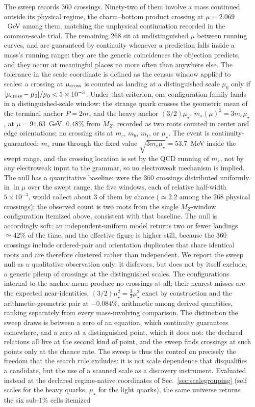 \documentclass[aps,twocolumn,superscriptaddress,nofootinbib,floatfix]{revtex4-2}
\newcommand{\mstar}{\mu_\star}
\begin{document}
The sweep records 360 crossings. Ninety-two of them involve a mass continued outside its physical regime, the charm--bottom product crossing at $\mu=2.069$~GeV among them, matching the unphysical continuation recorded in the common-scale trial. The remaining 268 sit at undistinguished $\mu$ between running curves, and are guaranteed by continuity whenever a prediction falls inside a mass's running range: they are the generic coincidences the objection predicts, and they occur at meaningful places no more often than anywhere else. The tolerance in the scale coordinate is defined as the census window applied to scales: a crossing at $\mu_{\rm cross}$ is counted as landing at a distinguished scale $\mu_0$ only if $|\mu_{\rm cross}-\mu_0|/\mu_0<5\times10^{-3}$. Under that criterion, one configuration family lands in a distinguished-scale window: the strange quark crosses the geometric mean of the terminal anchor $P=2m_e$ and the heavy anchor $(3/2)\mstar$, $m_s(\mu)^2=3m_e\mstar$, at $\mu=91.63$~GeV, $0.48\%$ from $M_Z$, recorded as two roots counted in center and edge orientations; no crossing sits at $m_c$, $m_b$, $m_t$, or $\mstar$. The event is continuity-guaranteed: $m_s$ runs through the fixed value $\sqrt{3m_e\mstar}=53.7$~MeV inside the swept range, and the crossing location is set by the QCD running of $m_s$, not by any electroweak input to the grammar, so no electroweak mechanism is implied. The null has a quantitative baseline: were the $360$ crossings distributed uniformly in $\ln\mu$ over the swept range, the five windows, each of relative half-width $5\times10^{-3}$, would collect about $3$ of them by chance ($\simeq2.2$ among the $268$ physical crossings); the observed count is two roots from the single $M_Z$-window configuration itemized above, consistent with that baseline. The null is accordingly soft: an independent-uniform model returns two or fewer landings $\simeq42\%$ of the time, and the effective figure is higher still, because the $360$ crossings include ordered-pair and orientation duplicates that share identical roots and are therefore clustered rather than independent. We report the sweep null as a qualitative observation only: it disfavors, but does not by itself exclude, a generic pileup of crossings at the distinguished scales. The configurations internal to the anchor menu produce no crossings at all; their nearest misses are the expected near-identities, $(3/2)\mstar^2=\frac32\mstar^2$ exact by construction and the arithmetic-geometric pair at $-0.084\%$, arithmetic among derived quantities, ranking separately from every mass-involving comparison. The distinction the sweep draws is between a zero of an equation, which continuity guarantees somewhere, and a zero at a distinguished point, which it does not: the declared relations all live at the second kind of point, and the sweep finds crossings at such points only at the chance rate. The sweep is thus the control on precisely the freedom that the search rule excludes: it is not scale dependence that disqualifies a candidate, but the use of a scanned scale as a discovery instrument. Evaluated instead at the declared regime-native coordinates of Sec.~\ref{sec:scalegrouping} (self scales for the heavy quarks, $\mstar$ for the light quarks), the same universe returns the six sub-$1\%$ cells itemized 
\end{document}
